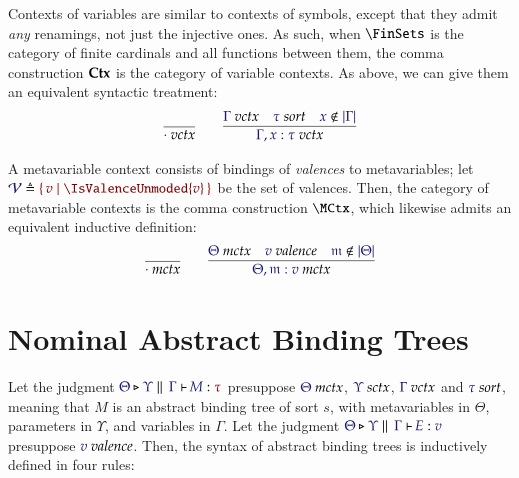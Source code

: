 \documentclass[11pt]{article}
\theoremstyle{definition}
\theoremstyle{remark}
\numberwithin{equation}{section}
\begin{document}
Contexts of variables are similar to contexts of symbols, except that they
admit \emph{any} renamings, not just the injective ones. As such, when
$\FinSets$ is the category of finite cardinals and all functions between them, the
comma construction $\mathbf{Ctx}$ is the category of variable contexts. As above, we
can give them an equivalent syntactic treatment:
\begin{gather*}
  \infer{
    \IsVarCtx{\cdot}
  }{
  }
\qquad
  \infer{
    \IsVarCtx{\Gamma,x:\tau}
  }{
    \IsVarCtx{\Gamma}
&
    \IsSort{\tau}
&
    \NotIn{x}{\Dom\Gamma}
  }
\end{gather*}

A metavariable context consists of bindings of \emph{valences} to
metavariables; let $\Define{\Valences}{\MkSet{v\mid \IsValenceUnmoded{v}}}$ be the set
of valences. Then, the category of metavariable contexts is the comma
construction $\MCtx$, which likewise admits an equivalent inductive definition:
\begin{gather*}
  \infer{
    \IsMetaCtx{\cdot}
  }{
  }
\qquad
  \infer{
    \IsMetaCtx{\Theta,\MV{m}:v}
  }{
    \IsMetaCtx{\Theta}
&
    \IsValence{v}
&
    \NotIn{\MV{m}}{\Dom\Theta}
  }
\end{gather*}



\section{Nominal Abstract Binding Trees}

Let the judgment $\IsAbt{\Theta}{\Upsilon}{\Gamma}{M}{\tau}$ presuppose
$\IsMetaCtx{\Theta}$, $\IsSymCtx\Upsilon$, $\IsVarCtx\Gamma$ and
$\IsSort{\tau}$, meaning that $M$ is an abstract binding tree of sort $s$, with
metavariables in $\Theta$, parameters in $\Upsilon$, and variables in $\Gamma$.
Let the judgment $\IsBTm{\Theta}{\Upsilon}{\Gamma}{E}{v}$ presuppose
$\IsValence{v}$. Then, the syntax of abstract binding trees is inductively
defined in four rules:
\end{document}
